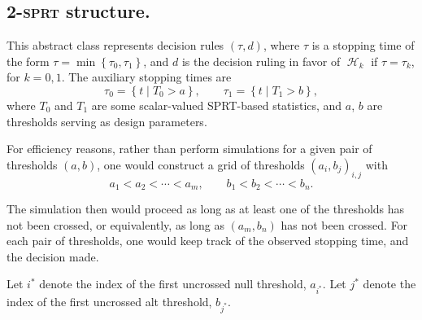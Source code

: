 \documentclass[12pt]{article}
\newcommand{\set}[1]{\left\{ #1 \right\}}
\DeclareMathOperator{\Hyp}{\mathcal{H}}
\begin{document}

\subsection*{2-\textsc{sprt} structure.}

This abstract class represents decision rules $(\tau, d)$, where $\tau $ is a stopping time of the form $\tau = \min \set{\tau _0, \tau _1}$, and $d$ is the decision ruling in favor of $\Hyp _k$ if $\tau = \tau _k$, for $k = 0, 1$. The auxiliary stopping times are
\[
    \tau _0 = \set{t \mid T_0 > a}, \qquad
    \tau _1 = \set{t \mid T_1 > b},
\]
where $T_0$ and $T_1$ are some scalar-valued SPRT-based statistics, and $a$, $b$ are thresholds serving as design parameters.

For efficiency reasons, rather than perform simulations for a given pair of thresholds $(a, b)$, one would construct a grid of thresholds $(a_i, b_j)_{i, j}$ with
\[
    a_1 < a_2 < \cdots < a_m, \qquad
    b_1 < b_2 < \cdots < b_n.
\]

\begin{center}
\end{center}

The simulation then would proceed as long as at least one of the thresholds has not been crossed, or equivalently, as long as $(a_m, b_n)$ has not been crossed. For each pair of thresholds, one would keep track of the observed stopping time, and the decision made.

%
Let $i^*$ denote the index of the first uncrossed null threshold, $a_{i^*}$.
Let $j^*$ denote the index of the first uncrossed alt threshold, $b_{j^*}$.
\end{document}
